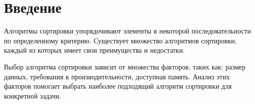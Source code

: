 \chapter*{Введение}

Алгоритмы сортировки упорядочивают элементы в некоторой последовательности по определенному критерию.
Существует множество алгоритмов сортировки, каждый из которых имеет свои преимущества и недостатки.


Выбор алгоритма сортировки зависит от множества факторов, таких как: размер данных, требования к производительности, доступная память.
Анализ этих факторов помогает выбрать наиболее подходящий алгоритм сортировки для конкретной задачи.

\newpage